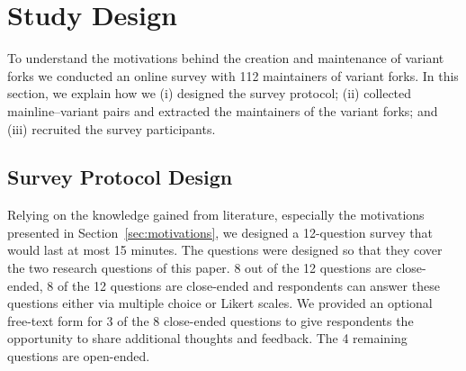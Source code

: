 \section{Study Design}
\label{sec:study_design}

To understand the motivations behind the creation and maintenance of variant forks we conducted an online survey with 112 maintainers of variant forks. In this section, we explain how we (i) designed the survey protocol; (ii) collected mainline--variant pairs and extracted the maintainers of the variant forks; and (iii) recruited the survey participants.


\subsection{Survey Protocol Design}
\label{sec:protocal}

Relying on the knowledge gained from literature, especially the motivations  presented in Section~\ref{sec:motivations}, we designed a 12-question survey that would last at most 15 minutes.
The questions were designed so that they cover the two research questions of this paper. 8 out of the 12 questions are close-ended,
8 of the 12 questions are close-ended and respondents can answer these questions either via multiple choice or Likert scales. We provided an optional free-text form for 3 of the 8 close-ended questions to give respondents the opportunity to share additional thoughts and feedback.
The 4 remaining questions are open-ended.



